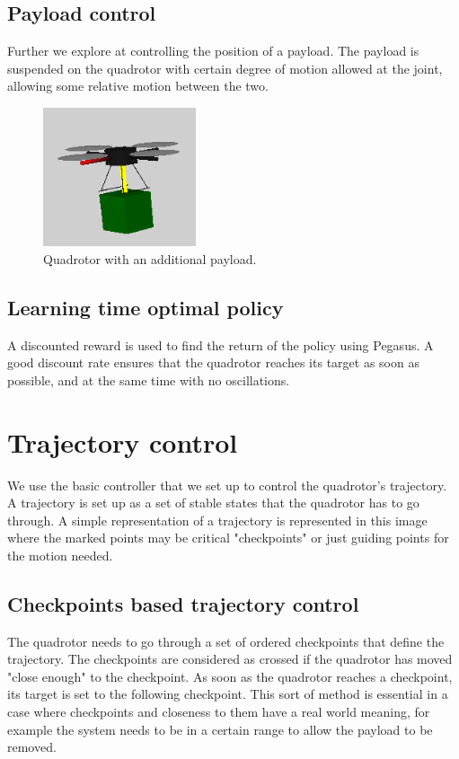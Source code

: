 \documentclass[hidelinks,BTech]{iitmdiss}
\begin{document}
\section{Payload control}
Further we explore at controlling the position of a payload. The payload is suspended on the quadrotor with certain degree of motion allowed at the joint, allowing some relative motion between the two.

\begin{figure}[H]
  \centering
    \includegraphics[width=0.4\textwidth]{payload_sim.png}
    \caption{Quadrotor with an additional payload.}
\end{figure}

\section{Learning time optimal policy}
A discounted reward is used to find the return of the policy using Pegasus. A good discount rate ensures that the quadrotor reaches its target as soon as possible, and at the same time with no oscillations.

\chapter{Trajectory control}
We use the basic controller that we set up to control the quadrotor's trajectory. A trajectory is set up as a set of stable states that the quadrotor has to go through. A simple representation of a trajectory is represented in this image where the marked points may be critical "checkpoints" or just guiding points for the motion needed.


\section{Checkpoints based trajectory control}
The quadrotor needs to go through a set of ordered checkpoints that define the trajectory. The checkpoints are considered as crossed if the quadrotor has moved "close enough" to the checkpoint. As soon as the quadrotor reaches a checkpoint, its target is set to the following checkpoint. This sort of method is essential in a case where checkpoints and closeness to them have a real world meaning, for example the system needs to be in a certain range to allow the payload to be removed.
\end{document}

